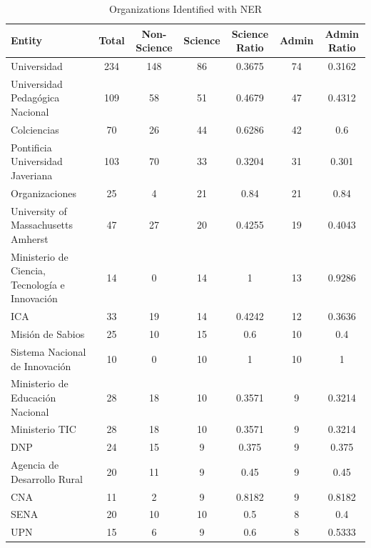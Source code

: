 \documentclass[11pt,                                                            
 superscriptaddress,twoside,
 amsmath,amssymb,
 aps, physrev
]{revtex4-2}
\begin{document}
\begin{table}[H]
	\centering
	\caption{Organizations Identified with NER}
	\label{tab:ner_organizations}
	\begin{tabular}{lcccccc}
		\hline
		\textbf{Entity} & \textbf{Total} & \textbf{Non-Science} & \textbf{Science} & \textbf{Science Ratio} & \textbf{Admin} & \textbf{Admin Ratio} \\
		\hline
		Universidad                                   & 234 & 148 & 86 & 0.3675 & 74 & 0.3162 \\
		Universidad Pedagógica Nacional              & 109 & 58  & 51 & 0.4679 & 47 & 0.4312 \\
		Colciencias                                   & 70  & 26  & 44 & 0.6286 & 42 & 0.6    \\
		Pontificia Universidad Javeriana             & 103 & 70  & 33 & 0.3204 & 31 & 0.301  \\
		Organizaciones                                & 25  & 4   & 21 & 0.84   & 21 & 0.84   \\
		University of Massachusetts Amherst           & 47  & 27  & 20 & 0.4255 & 19 & 0.4043 \\
		Ministerio de Ciencia, Tecnología e Innovación & 14  & 0   & 14 & 1      & 13 & 0.9286 \\
		ICA                                           & 33  & 19  & 14 & 0.4242 & 12 & 0.3636 \\
		Misión de Sabios                              & 25  & 10  & 15 & 0.6    & 10 & 0.4    \\
		Sistema Nacional de Innovación                & 10  & 0   & 10 & 1      & 10 & 1      \\
		Ministerio de Educación Nacional              & 28  & 18  & 10 & 0.3571 & 9  & 0.3214 \\
		Ministerio TIC                                & 28  & 18  & 10 & 0.3571 & 9  & 0.3214 \\
		DNP                                           & 24  & 15  & 9  & 0.375  & 9  & 0.375  \\
		Agencia de Desarrollo Rural                   & 20  & 11  & 9  & 0.45   & 9  & 0.45   \\
		CNA                                           & 11  & 2   & 9  & 0.8182 & 9  & 0.8182 \\
		SENA                                          & 20  & 10  & 10 & 0.5    & 8  & 0.4    \\
		UPN                                           & 15  & 6   & 9  & 0.6    & 8  & 0.5333 \\
		\hline
	\end{tabular}
\end{table}
\end{document}
